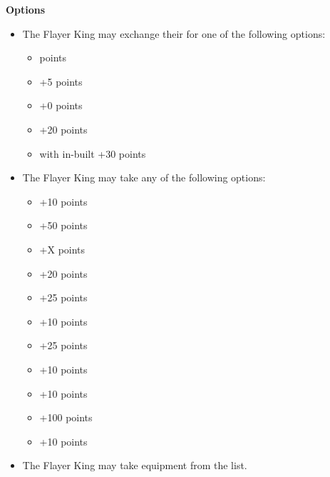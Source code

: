 \begin{minipage}[t]{0.72\textwidth}
	\vspace*{2em}
	\textbf{Options}
	\begin{itemize}
		\item The Flayer King may exchange their  for one of the following options:
		\begin{itemize}			
			\item {}  points
			\item {} \dotfill +5 points
			\item {} \dotfill +0 points
			\item {} \dotfill +20 points
			\item {} with in-built  \dotfill +30 points
		\end{itemize}
		\item The Flayer King may take any of the following options:
		\begin{itemize}
			\item {} \dotfill +10 points
			\item {} \dotfill +50 points
			\item {}\dotfill +X points
			\item {} \dotfill +20 points
			\item {} \dotfill +25 points
			\item {} \dotfill +10 points
			\item {} \dotfill +25 points
			\item {} \dotfill +10 points
			\item {} \dotfill +10 points
			\item {} \dotfill +100 points
			\item {} \dotfill +10 points
		\end{itemize}
		\item The Flayer King may take equipment from the  list.
	\end{itemize}
\end{minipage}
\hspace{0.5em}


